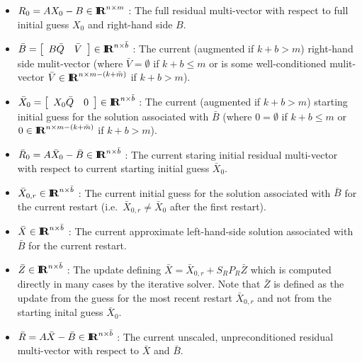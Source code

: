 \documentclass[pdf,ps2pdf,11pt]{SANDreport}
\begin{document}
\begin{itemize}

{}\item $R_0 = A X_0 - B {}\in\RE^{n
{}\times m}$ : The full residual multi-vector with respect to
full initial guess $X_0$ and right-hand side $B$.

{}\item $\bar{B}={\bmat{cc} B \bar{Q} & \bar{V} \emat}\in\RE^{n
{}\times \bar{b}}$ : The current (augmented if $k+b > m$)
right-hand side mulit-vector (where $\bar{V}=\emptyset$ if $k+b {}\leq
m$ or is some well-conditioned mulit-vector $\bar{V}\in\RE^{n {}\times
m-(k+\bar{m})}$ if $k+b > m$).

{}\item $\bar{X}_0={\bmat{cc} X_0 \bar{Q} & 0 \emat}\in\RE^{n {}\times
{}\bar{b}}$ : The current (augmented if $k+b > m$) starting initial
guess for the solution associated with $\bar{B}$ (where $0=\emptyset$
if $k+b {}\leq m$ or $0\in\RE^{n {}\times m-(k+\bar{m})}$ if $k+b >
m$).

{}\item $\bar{R}_0 = A \bar{X}_0 - \bar{B} {}\in\RE^{n
{}\times {}\bar{b}}$ : The current staring initial residual
multi-vector with respect to current starting initial guess
$\bar{X}_0$.

{}\item $\bar{X}_{0,r}\in\RE^{n {}\times {}\bar{b}}$ : The current
initial guess for the solution associated with $\bar{B}$ for the
current restart (i.e.~$\bar{X}_{0,r} {}\neq \bar{X}_0$ after the first
restart).

{}\item $\bar{X}\in\RE^{n {}\times {}\bar{b}}$ : The current
approximate left-hand-side solution associated with $\bar{B}$ for the
current restart.

{}\item $\bar{Z}\in\RE^{n {}\times {}\bar{b}}$ : The update defining
$\bar{X} = \bar{X}_{0,r} + S_R P_R \bar{Z}$ which is computed directly
in many cases by the iterative solver.  Note that $\bar{Z}$ is defined
as the update from the guess for the most recent restart
$\bar{X}_{0,r}$ and not from the starting inital guess $\bar{X}_0$.

{}\item $\bar{R} = A \bar{X} - \bar{B} {}\in\RE^{n {}\times
{}\bar{b}}$ : The current unscaled, unpreconditioned residual
multi-vector with respect to $\bar{X}$ and $\bar{B}$.

\end{itemize}
\end{document}
